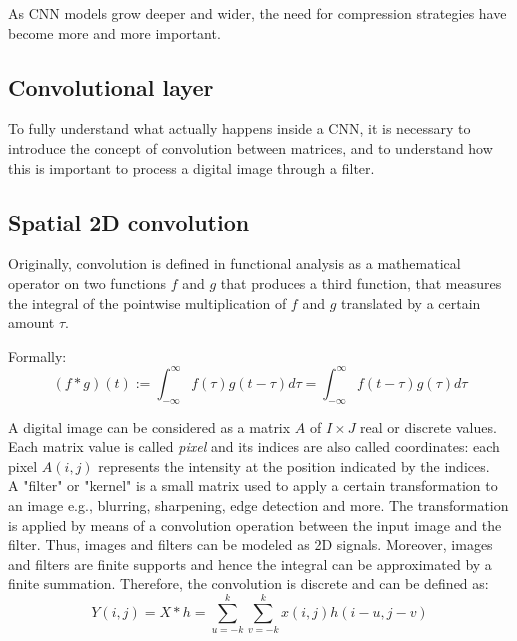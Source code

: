 As CNN models grow deeper and wider, the need for compression strategies have become more and more important. 

\subsection{Convolutional layer} 
To fully understand what actually happens inside a CNN, it is necessary to introduce the concept of convolution between matrices, and to understand how this is important to process a digital image through a filter.

\subsection{Spatial 2D convolution}
Originally, convolution is defined in functional analysis as a mathematical operator on two functions $f$ and $g$ that produces a third function, that measures the integral of the pointwise multiplication of $f$ and $g$ translated by a certain amount $\tau$. 

Formally: 
\begin{equation}
    (f*g)(t):=\int_{-\infty}^{\infty} f(\tau)g(t-\tau) d\tau= \int_{-\infty}^{\infty} f(t-\tau)g(\tau) d\tau
\end{equation}


A digital image can be considered as a matrix $A$ of $I\times J$ real or discrete values. Each matrix value is called \emph{pixel} and its indices are also called coordinates: each pixel $A(i, j)$ represents the intensity at the position indicated by the indices. 
\\
A "filter" or "kernel"  is a small matrix used to apply a certain transformation to an image e.g., blurring, sharpening, edge detection and more. The transformation is applied by means of a convolution operation between the input image and the filter. Thus, images and filters can be modeled as 2D signals. Moreover, images and filters are finite supports and hence the integral can be approximated by a finite summation. Therefore, the  convolution is discrete and can be defined as: 
\begin{equation}
\label{eq:2Dconvolution}
    Y(i,j) = X* h = \sum_{u=-k}^{k} \sum_{v=-k}^{k}x(i,j) h(i-u,j-v)
\end{equation}

